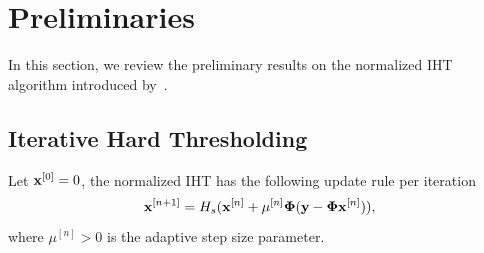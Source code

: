 \documentclass{article}
\begin{document}
\section{Preliminaries}
In this section, we review the preliminary results on the normalized IHT algorithm introduced by~\cite{blumensath2010niht, blumensath2012greedy}.
\subsection{Iterative Hard Thresholding} 
Let ${\bf x}^{[0]} = 0$, the normalized IHT has the following update rule per iteration
\begin{equation}\label{iht_update_rule}
{\bf x}^{[n+1]} = H_s({\bf x}^{[n]} + \mu^{[n]}{\bf \Phi}({\bf y}-{\bf \Phi}{\bf x}^{[n]})),
\end{equation}
where $\mu^{[n]}>0$ is the adaptive step size parameter. %
\end{document}
